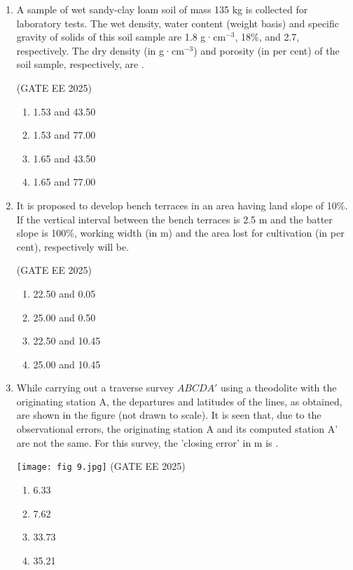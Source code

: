 \documentclass[journal,12pt,onecolumn]{IEEEtran}
\theoremstyle{remark}
\begin{document}
\begin{enumerate}
\item A sample of wet sandy-clay loam soil of mass 135 kg is collected for laboratory tests. The wet density, water content (weight basis) and specific gravity of solids of this soil sample are 1.8 g·cm$^{-3}$, 18\%, and 2.7, respectively. The dry density (in g·cm$^{-3}$) and porosity (in per cent) of the soil sample, respectively, are .

\hfill(GATE EE 2025)

\begin{multicols}{4}
\begin{enumerate}
\item 1.53 and 43.50
\item 1.53 and 77.00
\item 1.65 and 43.50
\item 1.65 and 77.00
\end{enumerate}
\end{multicols}

\item It is proposed to develop bench terraces in an area having land slope of 10\%. If the vertical interval between the bench terraces is 2.5 m and the batter slope is 100\%, working width (in m) and the area lost for cultivation (in per cent), respectively will be.

\hfill(GATE EE 2025)

\begin{multicols}{4}
\begin{enumerate}
\item 22.50 and 0.05
\item 25.00 and 0.50
\item 22.50 and 10.45
\item 25.00 and 10.45
\end{enumerate}
\end{multicols}

\item While carrying out a traverse survey $ABCDA'$ using a theodolite with the originating station A, the departures and latitudes of the lines, as obtained, are shown in the figure (not drawn to scale). It is seen that, due to the observational errors, the originating station A and its computed station A' are not the same. For this survey, the 'closing error' in m is .

 \texttt{[image: fig 9.jpg]}
\hfill(GATE EE 2025)

\begin{multicols}{4}
\begin{enumerate}
\item 6.33
\item 7.62
\item 33.73
\item 35.21
\end{enumerate}
\end{multicols}


\end{enumerate}
\end{document}
